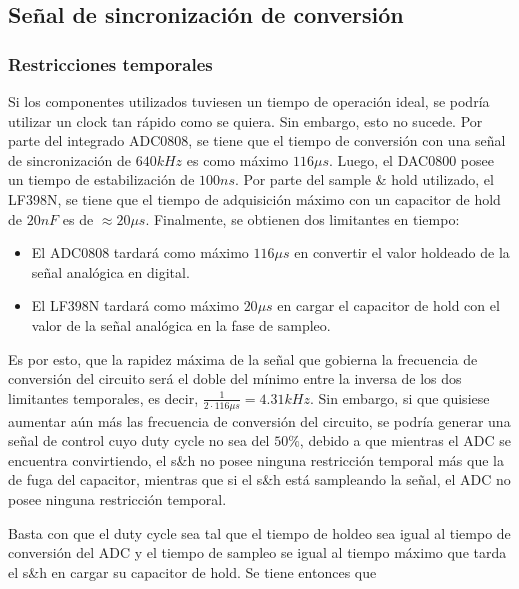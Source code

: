 \subsection{Señal de sincronización de conversión}

\subsubsection{Restricciones temporales}

Si los componentes utilizados tuviesen un tiempo de operación ideal, se podría utilizar un clock tan rápido como se quiera. Sin embargo, esto no sucede. Por parte del integrado ADC0808, se tiene que el tiempo de conversión con una señal de sincronización de $640kHz$ es como máximo $116\mu s$. Luego, el DAC0800 posee un tiempo de estabilización de $100ns$. Por parte del sample \& hold utilizado, el LF398N, se tiene que el tiempo de adquisición máximo con un capacitor de hold de $20 nF$ es de $\approx 20\mu s$. Finalmente, se obtienen dos limitantes en tiempo: 

\begin{itemize}
\item El ADC0808 tardará como máximo $116\mu s$ en convertir el valor holdeado de la señal analógica en digital.
\item El LF398N tardará como máximo $20\mu s$ en cargar el capacitor de hold con el valor de la señal analógica en la fase de sampleo.
\end{itemize}

Es por esto, que la rapidez máxima de la señal que gobierna la frecuencia de conversión del circuito será el doble del mínimo entre la inversa de los dos limitantes temporales, es decir, $\frac{1}{2\cdot 116\mu s} = 4.31kHz$. Sin embargo, si que quisiese aumentar aún más las frecuencia de conversión del circuito, se podría generar una señal de control cuyo duty cycle no sea del $50\%$, debido a que mientras el ADC se encuentra convirtiendo, el s\&h no posee ninguna restricción temporal más que la de fuga del capacitor, mientras que si el s\&h está sampleando la señal, el ADC no posee ninguna restricción temporal.


Basta con que el duty cycle sea tal que el tiempo de holdeo sea igual al tiempo de conversión del ADC y el tiempo de sampleo se igual al tiempo máximo que tarda el s\&h en cargar su capacitor de hold. Se tiene entonces que

